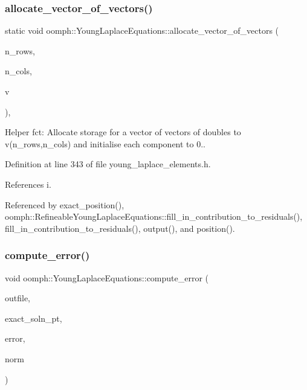 \subsubsection{\texorpdfstring{allocate\+\_\+vector\+\_\+of\+\_\+vectors()}{allocate\_vector\_of\_vectors()}}
{\footnotesize\ttfamily static void oomph\+::\+Young\+Laplace\+Equations\+::allocate\+\_\+vector\+\_\+of\+\_\+vectors (\begin{DoxyParamCaption}\item[{unsigned}]{n\+\_\+rows,  }\item[{unsigned}]{n\+\_\+cols,  }\item[{\hyperlink{classoomph_1_1Vector}{Vector}$<$ \hyperlink{classoomph_1_1Vector}{Vector}$<$ double $>$ $>$ \&}]{v }\end{DoxyParamCaption})\hspace{0.3cm}{\ttfamily [inline]}, {\ttfamily [static]}}



Helper fct\+: Allocate storage for a vector of vectors of doubles to v(n\+\_\+rows,n\+\_\+cols) and initialise each component to 0.. 



Definition at line 343 of file young\+\_\+laplace\+\_\+elements.\+h.



References i.



Referenced by exact\+\_\+position(), oomph\+::\+Refineable\+Young\+Laplace\+Equations\+::fill\+\_\+in\+\_\+contribution\+\_\+to\+\_\+residuals(), fill\+\_\+in\+\_\+contribution\+\_\+to\+\_\+residuals(), output(), and position().

\mbox{\label{classoomph_1_1YoungLaplaceEquations_a7e8a3eb5a609e2ba84630b36f5ff5ee2}} 
\subsubsection{\texorpdfstring{compute\+\_\+error()}{compute\_error()}\hspace{0.1cm}{\footnotesize\ttfamily [1/2]}}
{\footnotesize\ttfamily void oomph\+::\+Young\+Laplace\+Equations\+::compute\+\_\+error (\begin{DoxyParamCaption}\item[{std\+::ostream \&}]{outfile,  }\item[{\hyperlink{classoomph_1_1FiniteElement_a690fd33af26cc3e84f39bba6d5a85202}{Finite\+Element\+::\+Steady\+Exact\+Solution\+Fct\+Pt}}]{exact\+\_\+soln\+\_\+pt,  }\item[{double \&}]{error,  }\item[{double \&}]{norm }\end{DoxyParamCaption})\hspace{0.3cm}{\ttfamily [virtual]}}



